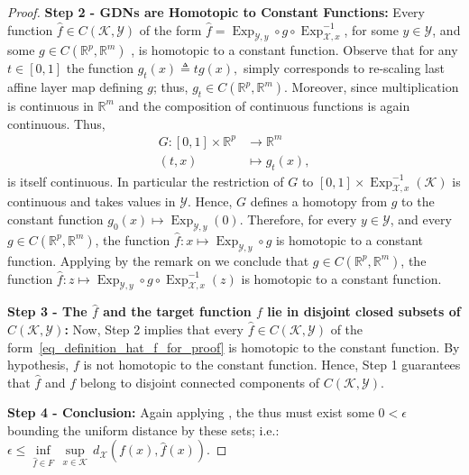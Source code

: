 \documentclass[anon,12pt]{colt2021} %
\newcommand{\rr}{{\mathbb{R}}}
\newcommand{\rrflex}[1]{{\ensuremath{\rr^{#1}
}}}
\newcommand{\rrm}{{\rrflex{m}}}
\newcommand{\rrp}{{\rrflex{p}}}
\newcommand{\xxx}{\mathcal{X}}
\newcommand{\yyy}{\mathcal{Y}}
\newcommand{\nn}{{\mathbb{N}}}
\newcommand{\kkk}{{\mathscr{K}}}
\begin{document}
\begin{proof}
\textbf{Step 2 - GDNs are Homotopic to Constant Functions:}  
Every function $\hat{f} \in C(\kkk,\yyy)$ of the form $\hat{f} = \operatorname{Exp}_{\yyy,y}\circ g\circ \operatorname{Exp}_{\xxx,x}^{-1}$, for some $y \in \yyy$, 
and some 
$g \in 
C(\rrp,\rrm)
$
, is homotopic to a constant function.  
Observe that for any $t \in [0,1]$ the function 
$
g_t(x)\triangleq tg(x),
$ 
simply corresponds to re-scaling last affine layer map defining $g$; thus, 
$
g_t \in 
C(\rrp,\rrm)
$.  Moreover, since multiplication is continuous in $\rrflex{m}$ and the composition of continuous functions is again continuous.  Thus, 
$$
\begin{aligned}
 G:[0,1]\times \rrflex{p}&\rightarrow \rrflex{m}    \\
 (t,x)&\mapsto g_t(x)
,
\end{aligned}
$$
is itself continuous.  In particular the restriction of $G$ to $[0,1]\times \operatorname{Exp}_{\xxx,x}^{-1}(\kkk)$ is continuous and takes values in $\yyy$.  Hence, $G$ defines a homotopy from $g$ to the constant function $g_0(x)\mapsto \operatorname{Exp}_{\yyy,y}(0)$.  Therefore, for every $y \in \yyy$, 
and every $g\in 
C(\rrp,\rrm)
$, 
the function $\hat{f}:x\mapsto \operatorname{Exp}_{\yyy,y}\circ g$ is homotopic to a constant function.  Applying by the remark on \citep[page 26]{FuchsFomenkoHomotopicalTopology2016Edition2} we conclude that 
$g\in
C(\rrp,\rrm)
$, 
the function $\hat{f}:z\mapsto \operatorname{Exp}_{\yyy,y}\circ g\circ \operatorname{Exp}_{\xxx,x}^{-1}(z)$ is homotopic to a constant function. 


\textbf{Step 3 - The $\hat{f}$ and the target function $f$ lie in disjoint closed subsets of $C(\kkk,\yyy)$:}  
Now, Step 2 implies that every $\hat{f}\in C(\kkk,\yyy)$ of the form~\eqref{eq_definition_hat_f_for_proof} is homotopic to the constant function.  By hypothesis, $f$ is not homotopic to the constant function.  Hence, Step 1 guarantees that $\hat{f}$ and $f$ belong to disjoint connected components of $C(\kkk,\yyy)$.  

\textbf{Step 4 - Conclusion:}  
Again applying \citep[Theorem 46.8]{munkres2014topology}, the thus must exist some $0<\epsilon$ bounding the uniform distance by these sets; i.e.: 
$
\epsilon\leq 
\underset{{\hat{f}\in F}}{\inf}\,
\underset{x \in \kkk}{\sup}
\,
d_{\xxx}\left(
f(x), \hat{f}(x)
\right) 
.
$
\end{proof}
%
\end{document}
